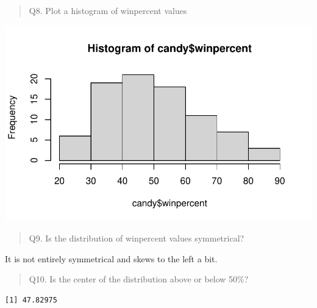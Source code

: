\documentclass[
  letterpaper,
  DIV=11,
  numbers=noendperiod]{scrartcl}
\newenvironment{Shaded}{\begin{snugshade}}{\end{snugshade}}
\newcommand{\FunctionTok}[1]{\textcolor[rgb]{0.28,0.35,0.67}{#1}}
\newcommand{\NormalTok}[1]{\textcolor[rgb]{0.00,0.23,0.31}{#1}}
\newcommand{\SpecialCharTok}[1]{\textcolor[rgb]{0.37,0.37,0.37}{#1}}
\begin{document}
\begin{quote}
Q8. Plot a histogram of winpercent values
\end{quote}

\begin{Shaded}
\end{Shaded}

\includegraphics{Class09_files/figure-pdf/unnamed-chunk-9-1.pdf}

\begin{quote}
Q9. Is the distribution of winpercent values symmetrical?
\end{quote}

It is not entirely symmetrical and skews to the left a bit.

\begin{quote}
Q10. Is the center of the distribution above or below 50\%?
\end{quote}

\begin{Shaded}
\end{Shaded}

\begin{verbatim}
[1] 47.82975
\end{verbatim}

\begin{Shaded}
\end{Shaded}
\end{document}
